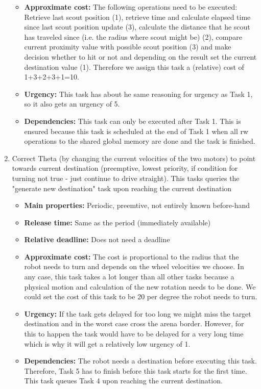 \documentclass[12pt]{article}
\begin{document}
\begin{enumerate}
\begin{itemize}
  	\item \textbf{Approximate cost:} The following operations need to be executed: Retrieve last scout position (1), retrieve time and calculate elapsed time since last scout position update (3), calculate the distance that he scout has traveled since (i.e. the radius where scout might be) (2), compare current proximity value with possible scout position (3) and make decision whether to hit or not and depending on the result set the current destination value (1). Therefore we assign this task a (relative) cost of 1+3+2+3+1=10. 
  	\item \textbf{Urgency:} This task has about he same reasoning for urgency as Task 1, so it also gets an urgency of 5.
  	\item \textbf{Dependencies:} This task can only be executed after Task 1. This is ensured because this task is scheduled at the end of Task 1 when all rw operations to the shared global memory are done and the task is finished.
   	\end{itemize} 	
  \item Correct Theta (by changing the current velocities of the two motors) to point towards current destination (preemptive, lowest priority, if condition for turning not true - just continue to drive straight). This tasks queries the "generate new destination" task upon reaching the current destination
  \begin{itemize}
  	\item \textbf{Main properties:} Periodic, preemtive, not entirely known before-hand
  	\item \textbf{Release time:} Same as the period (immediately available)
  	\item \textbf{Relative deadline:} Does not need a deadline
  	\item \textbf{Approximate cost:} The cost is proportional to the radius that the robot needs to turn and depends on the wheel velocities we choose. In any case, this task takes a lot longer than all other tasks because a physical motion and calculation of the new rotation needs to be done. We could set the cost of this task to be 20 per degree the robot needs to turn.
  	\item \textbf{Urgency:} If the task gets delayed for too long we might miss the target destination and in the worst case cross the arena border. However, for this to happen the task would have to be delayed for a very long time which is why it will get a relatively low urgency of 1.
  	\item \textbf{Dependencies:} The robot needs a destination before executing this task. Therefore, Task 5 has to finish before this task starts for the first time. This task queues Task 4 upon reaching the current destination.

\end{itemize}
\end{enumerate}
\end{document}
